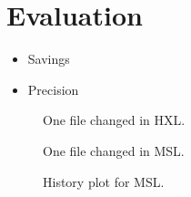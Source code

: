 \documentclass{cslthse-msc}
\begin{document}
\chapter[Evaluation]{Evaluation}
\begin{itemize}
	\item Savings
	\item Precision
\end{itemize}

\begin{figure}
    \centering
    \caption{One file changed in HXL.}
    \label{fig:hxlonefile}
\end{figure}

\begin{figure}
    \centering
    \caption{One file changed in MSL.}
    \label{fig:mslonefile}
\end{figure}

\begin{figure}
    \centering
    \caption{History plot for MSL.}
    \label{fig:mslhistory}
\end{figure}
\end{document}
